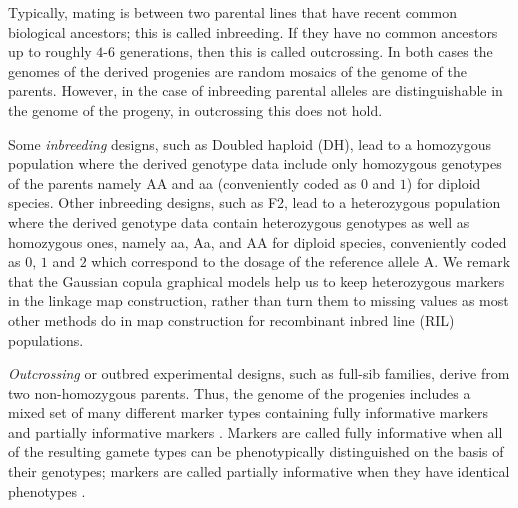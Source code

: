 Typically, mating is between two parental lines that have recent common biological ancestors; this is called inbreeding. If they have no common ancestors up to roughly $4$-$6$ generations, then this is called outcrossing. In both cases the genomes of the derived progenies are random mosaics of the genome of the parents. However, in the case of inbreeding parental alleles are distinguishable in the genome of the progeny, in outcrossing this does not hold.   

Some \emph{inbreeding} designs, such as Doubled haploid (DH), lead to a homozygous population where the derived genotype data include only homozygous genotypes of the parents namely AA and aa (conveniently coded as $0$ and $1$) for diploid species. Other inbreeding designs, such as F2, lead to a heterozygous population where the derived genotype data contain heterozygous genotypes as well as homozygous ones, namely aa, Aa, and AA for diploid species, conveniently coded as $0$, $1$ and $2$ which correspond to the dosage of the reference allele A. We remark that the Gaussian copula graphical models help us to keep heterozygous markers in the linkage map construction, rather than turn them to missing values as most other methods do in map construction for recombinant inbred line (RIL) populations.

\emph{Outcrossing} or outbred experimental designs, such as full-sib families, derive from two non-homozygous parents. Thus, the genome of the progenies includes a mixed set of many different marker types containing fully informative markers %
and partially informative markers %
. Markers are called fully informative when all of the resulting gamete types can be phenotypically distinguished on the basis of their genotypes; markers are called partially informative when they have identical phenotypes \citep{wu2002simultaneous}.


